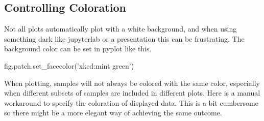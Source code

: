 \documentclass[]{book}
\newenvironment{Shaded}{\begin{snugshade}}{\end{snugshade}}
\newcommand{\StringTok}[1]{\textcolor[rgb]{0.31,0.60,0.02}{#1}}
\newcommand{\NormalTok}[1]{#1}
\begin{document}
\begin{Shaded}
\end{Shaded}

\subsection{Controlling Coloration}\label{controlling-coloration}

Not all plots automatically plot with a white background, and when using
something dark like jupyterlab or a presentation this can be
frustrating. The background color can be set in pyplot like this.

\begin{Shaded}
\begin{Highlighting}[]
\NormalTok{fig.patch.set_facecolor(}\StringTok{'xkcd:mint green'}\NormalTok{)}
\end{Highlighting}
\end{Shaded}

When plotting, samples will not always be colored with the same color,
especially when different subsets of samples are included in different
plots. Here is a manual workaround to specify the coloration of
displayed data. This is a bit cumbersome so there might be a more
elegant way of achieving the same outcome.
\end{document}
